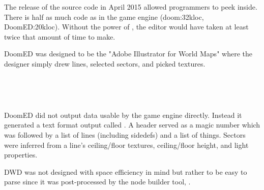 The release of the source code in April 2015 allowed programmers to peek inside. There is half as much code as in the game engine (doom:32kloc, DoomED:20kloc). Without the power of \NeXTns, the editor would have taken at least twice that amount of time to make.



\par
DoomED was designed to be the "Adobe Illustrator for World Maps" where the designer simply drew lines, selected sectors, and picked textures.\\
\par
\vspace{10pt}
\\
\par
{}\\
\par
DoomED did not output data usable by the game engine directly. Instead it generated a text format output called . A header served as a magic number which was followed by a list of lines (including sidedefs) and a list of things. Sectors were inferred from a line's ceiling/floor textures, ceiling/floor height, and light properties.\\
\par
{}
\par
DWD was not designed with space efficiency in mind but rather to be easy to parse since it was post-processed by the node builder tool, .\\
\par
{}
\par

\pagebreak





